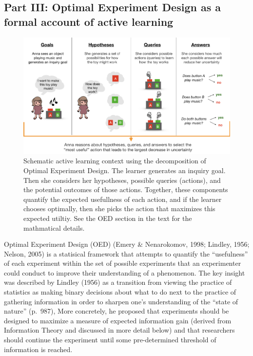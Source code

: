 \documentclass[english,floatsintext,man]{apa6}
\theoremstyle{definition}
\theoremstyle{definition}
\theoremstyle{definition}
\theoremstyle{remark}
\begin{document}
\subsection{Part III: Optimal Experiment Design as a formal account of
active
learning}\label{part-iii-optimal-experiment-design-as-a-formal-account-of-active-learning}

\begin{figure}[tb]
\includegraphics[width=1\linewidth]{macdonald_cada_files/figure-latex/unnamed-chunk-1-1} \caption{Schematic active learning context using the decomposition of Optimal Experiment Design. The learner generates an inquiry goal. Then she considers her hypotheses, possible queries (actions), and the potential outcomes of those actions. Together, these components quantify the expected usefullness of each action, and if the learner chooses optimally, then she picks the action that maximizes this expected utiltiy. See the OED section in the text for the mathmatical details.}\label{fig:unnamed-chunk-1}
\end{figure}

Optimal Experiment Design (OED) (Emery \& Nenarokomov, 1998; Lindley,
1956; Nelson, 2005) is a statisical framework that attempts to quantify
the \enquote{usefulness} of each experiment within the set of possible
experiments that an experimenter could conduct to improve their
understanding of a phenomenon. The key insight was described by Lindley
(1956) as a transition from viewing the practice of statistics as making
binary decisions about what to do next to the practice of gathering
information in order to sharpen one's understanding of the
\enquote{state of nature} (p.~987), More concretely, he proposed that
experiments should be designed to maximize a measure of expected
information gain (derived from Information Theory and discussed in more
detail below) and that researchers should continue the experiment until
some pre-determined threshold of information is reached.
\end{document}

